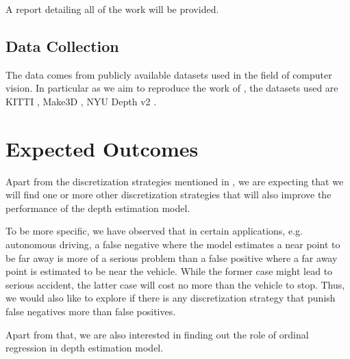 \documentclass[12pt,twoside]{article}
\begin{document}
A report detailing all of the work will be provided.

\subsection{Data Collection}
The data comes from publicly available datasets used in the field of computer vision. In particular as we aim to reproduce the work of \cite{huan_fu_deep_2018}, the datasets used are KITTI \cite{doi:10.1177/0278364913491297}, Make3D \cite{ashutosh_saxena_learning_2006, ashutosh_saxena_make3d:_2009}, NYU Depth v2 \cite{silberman2012indoor}.

\section{Expected Outcomes}
Apart from the discretization strategies mentioned in \cite{huan_fu_deep_2018}, we are expecting that we will find one or more other discretization strategies that will also improve the performance of the depth estimation model.

To be more specific, we have observed that in certain applications, e.g. autonomous driving, a false negative where the model estimates a near point to be far away is more of a serious problem than a false positive where a far away point is estimated to be near the vehicle. While the former case might lead to serious accident, the latter case will cost no more than the vehicle to stop. Thus, we would also like to explore if there is any discretization strategy that punish false negatives more than false positives.

Apart from that, we are also interested in finding out the role of ordinal regression in depth estimation model.
\end{document}
